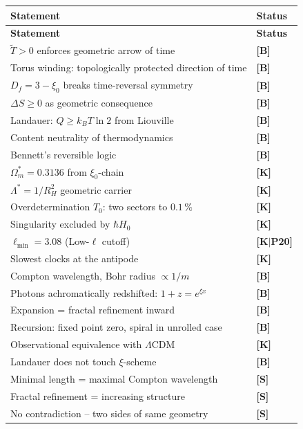 \begin{center}
	\small
	\begin{longtable}{@{}p{}l@{}}
		\toprule
		\textbf{Statement} & \textbf{Status} \\
		\midrule
		\endfirsthead
		\toprule
		\textbf{Statement} & \textbf{Status} \\
		\midrule
		\endhead
		$\tilde{T} > 0$ enforces geometric arrow of time & \textbf{[B]} \\
		Torus winding: topologically protected direction of time & \textbf{[B]} \\
		$D_f = 3-\xi_0$ breaks time-reversal symmetry & \textbf{[B]} \\
		$\Delta S \ge 0$ as geometric consequence & \textbf{[B]} \\
		Landauer: $Q \ge k_BT\ln 2$ from Liouville & \textbf{[B]} \\
		Content neutrality of thermodynamics & \textbf{[B]} \\
		Bennett's reversible logic & \textbf{[B]} \\
		$\Omega_m^* = 0.3136$ from $\xi_0$-chain & \textbf{[K]} \\
		$\Lambda^* = 1/R_H^2$ geometric carrier & \textbf{[K]} \\
		Overdetermination $T_0$: two sectors to $0.1\,\%$ & \textbf{[K]} \\
		Singularity excluded by $\hbar H_0$ & \textbf{[K]} \\
		$\ell_\text{min} = 3.08$ (Low-$\ell$ cutoff) & \textbf{[K$|$P20]} \\
		Slowest clocks at the antipode & \textbf{[K]} \\
		Compton wavelength, Bohr radius $\propto 1/m$ & \textbf{[B]} \\
		Photons achromatically redshifted: $1+z = e^{\xi x}$ & \textbf{[B]} \\
		Expansion = fractal refinement inward & \textbf{[B]} \\
		Recursion: fixed point zero, spiral in unrolled case & \textbf{[B]} \\
		Observational equivalence with $\Lambda$CDM & \textbf{[K]} \\
		Landauer does not touch $\xi$-scheme & \textbf{[B]} \\
		Minimal length = maximal Compton wavelength & \textbf{[S]} \\
		Fractal refinement = increasing structure & \textbf{[S]} \\
		No contradiction -- two sides of same geometry & \textbf{[S]} \\

\end{longtable}
\end{center}
